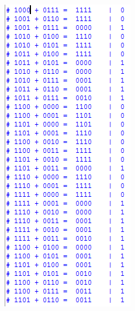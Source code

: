 \begin{figure}[H]
\begin{subfigure}[b]{0.44\textwidth}
			\label{fig:etapa3-5}
		\end{subfigure}
		~
		\begin{subfigure}[b]{0.44\textwidth}
			\includegraphics[width=\textwidth]{img/etapa3/simulacaoSomadorCompleto4Bits_6}
			\label{fig:etapa3-6}
		\end{subfigure}


\end{figure}
